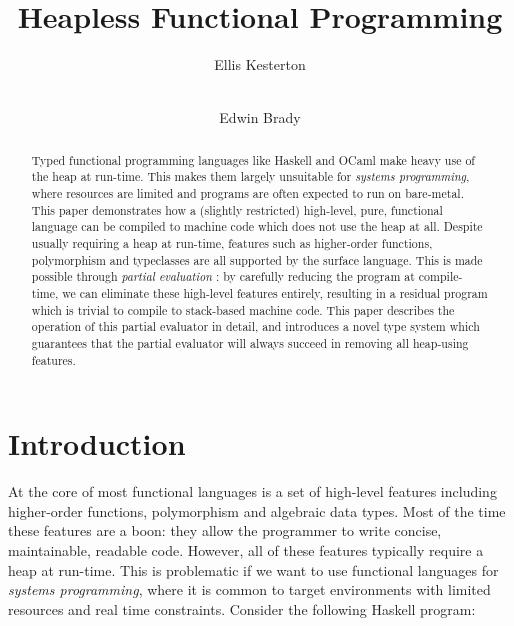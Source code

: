 \documentclass[runningheads]{llncs}
\begin{document}
%
\title{Heapless Functional Programming}
%
%
\author{Ellis Kesterton  \and \\
Edwin Brady }
%
%

\newcommand{\core}{$\mathcal{C}$}
\newcommand{\high}{$\mathcal{H}$}
\newcommand{\fom}{System $F_{\omega}$}
%
\maketitle              %
%
\begin{abstract}
Typed functional programming languages like Haskell and OCaml make heavy use of the heap at run-time. This makes them largely unsuitable for \emph{systems programming}, where resources are limited and programs are often expected to run on bare-metal. This paper demonstrates how a (slightly restricted) high-level, pure, functional language can be compiled to machine code which does not use the heap at all. Despite usually requiring a heap at run-time, features such as higher-order functions, polymorphism and typeclasses are all supported by the surface language. This is made possible through \emph{partial evaluation} \cite{jones1993partial}: by carefully reducing the program at compile-time, we can eliminate these high-level features entirely, resulting in a residual program which is trivial to compile to stack-based machine code. This paper describes the operation of this partial evaluator in detail, and introduces a novel type system which guarantees that the partial evaluator will always succeed in removing all heap-using features.

\end{abstract}
%
%
%
\section{Introduction}

At the core of most functional languages is a set of high-level features including higher-order functions, polymorphism and algebraic data types. Most of the time these features are a boon: they allow the programmer to write concise, maintainable, readable code. However, all of these features typically require a heap at run-time. This is problematic if we want to use functional languages for \emph{systems programming}, where it is common to target environments with limited resources and real time constraints. Consider the following Haskell program:
\end{document}
